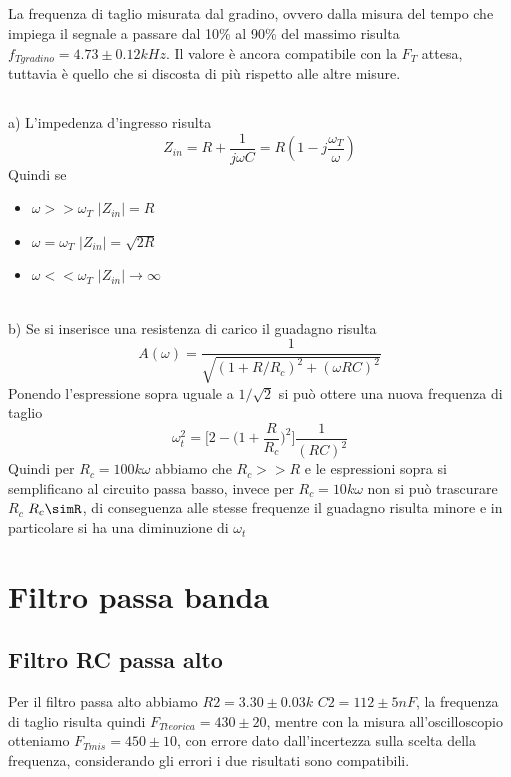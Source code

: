 \documentclass[10pt,a4paper]{article}
\begin{document}
\subsection{}
La frequenza di taglio misurata dal gradino, ovvero dalla misura del tempo che impiega il segnale a passare dal 10\% al 90\% del massimo risulta $f_{Tgradino}=4.73\pm0.12kHz$. Il valore è ancora compatibile con la $F_T$ attesa, tuttavia è quello che si discosta di più rispetto alle altre misure.
\subsection{}
a) L'impedenza d'ingresso risulta
\begin{equation}
	Z_{in} = R+\frac{1}{j \omega C} = R(1-j\frac{\omega_T}{\omega})
\end{equation}
Quindi se
\begin{itemize}
\item $\omega>>\omega_T$ $|Z_{in}|=R$
\item $\omega=\omega_T$ $|Z_{in}|=\sqrt{2R}$
\item $\omega<<\omega_T$ $|Z_{in}|\rightarrow \infty$
\end{itemize}
\\b)
Se si inserisce una resistenza di carico il guadagno risulta
\begin{equation}
	A(\omega)=\frac{1}{\sqrt{(1+R/R_c)^2+(\omega RC)^2}}
\end{equation}
Ponendo l'espressione sopra uguale a $1/\sqrt{2}$ si può ottere una nuova frequenza di taglio
\begin{equation}
	\omega_t^2=\bigg[2-\bigg(1+\frac{R}{R_c}\bigg)^2\bigg]\frac{1}{(RC)^2}
\end{equation}
Quindi per $R_c=100k \omega$ abbiamo che $R_c>>R$ e le espressioni sopra si semplificano al circuito passa basso, invece per $R_c=10k \omega$ non si può trascurare $R_c$ $R_c\simR$, di conseguenza alle stesse frequenze il guadagno risulta minore e in particolare si ha una diminuzione di $\omega_t$

\section{Filtro passa banda}
\subsection{Filtro RC passa alto}
Per il filtro passa alto abbiamo $R2=3.30\pm 0.03 k$ $C2=112\pm 5 nF$, la frequenza di taglio risulta quindi $F_{Tteorica}=430\pm20$, mentre con la misura all'oscilloscopio otteniamo $F_{Tmis}=450\pm10$, con errore dato dall'incertezza sulla scelta della frequenza, considerando gli errori i due risultati sono compatibili.
\end{document}
